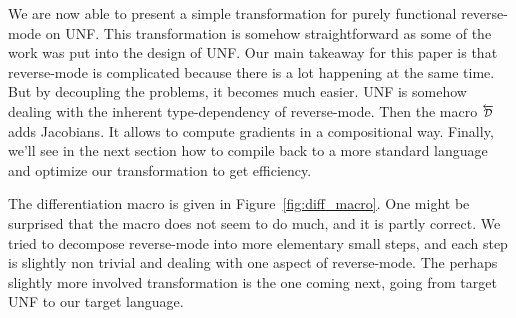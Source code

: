 We are now able to present a simple transformation for purely functional reverse-mode on UNF.
This transformation is somehow straightforward as some of the work was put into the design of UNF.
Our main takeaway for this paper is that reverse-mode is complicated because there is a lot happening at the same time. 
But by decoupling the problems, it becomes much easier. UNF is somehow dealing with the inherent type-dependency of reverse-mode.
Then the macro $\Dsynrevsymbol$ adds Jacobians. It allows to compute gradients in a compositional way.
Finally, we'll see in the next section how to compile back to a more standard language and optimize our transformation to get efficiency.

The differentiation macro is given in Figure~\ref{fig:diff_macro}.
One might be surprised that the macro does not seem to do much, and it is partly correct.
We tried to decompose reverse-mode into more elementary small steps, and each step is slightly non trivial and dealing with one aspect of reverse-mode.
The perhaps slightly more involved transformation is the one coming next,  going from target UNF to our target language.



